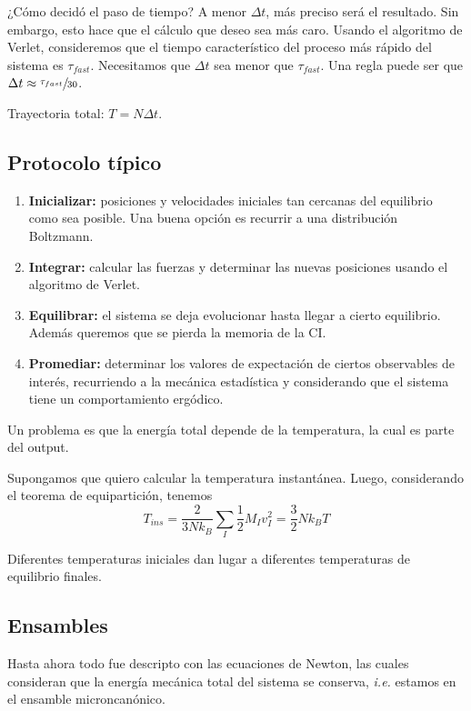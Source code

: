   ¿Cómo decidó el paso de tiempo? A menor $\Delta t$, más preciso será el resultado. Sin embargo, esto hace que el cálculo que deseo sea más caro. Usando el algoritmo de Verlet, consideremos que el tiempo característico del proceso más rápido del sistema es $\tau_{fast}$. Necesitamos que $\Delta t$ sea menor que $\tau_{fast}$. Una regla puede ser que $\Delta t \approx \sfrac{\tau_{fast}}{30}$.

  Trayectoria total: $T = N \Delta t$.

\subsection{Protocolo típico}

  \begin{enumerate}
    \item \textbf{Inicializar:} posiciones y velocidades iniciales tan cercanas del equilibrio como sea posible. Una buena opción es recurrir a una distribución Boltzmann.
    \item \textbf{Integrar:} calcular las fuerzas y determinar las nuevas posiciones usando el algoritmo de Verlet.
    \item \textbf{Equilibrar:} el sistema se deja evolucionar hasta llegar a cierto equilibrio. Además queremos que se pierda la memoria de la CI.
    \item \textbf{Promediar:} determinar los valores de expectación de ciertos observables de interés, recurriendo a la mecánica estadística y considerando que el sistema tiene un comportamiento ergódico.
  \end{enumerate}

  Un problema es que la energía total depende de la temperatura, la cual es parte del output.

  Supongamos que quiero calcular la temperatura instantánea. Luego, considerando el teorema de equipartición, tenemos
    $$T_{ins} = \frac{2}{3N k_B} \sum_I \frac{1}{2} M_I v_I^2 = \frac{3}{2} N k_B T$$

  Diferentes temperaturas iniciales dan lugar a diferentes temperaturas de equilibrio finales.

\subsection{Ensambles}

  Hasta ahora todo fue descripto con las ecuaciones de Newton, las cuales consideran que la energía mecánica total del sistema se conserva, \emph{i.e.} estamos en el ensamble microncanónico.

